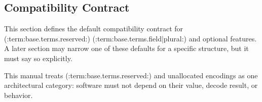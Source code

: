 \clearpage
\subsection{Compatibility Contract}

This section defines the default compatibility contract for (:term:base.terms.reserved:) (:term:base.terms.field|plural:) and optional features. A later section
may narrow one of these defaults for a specific structure, but it must say so explicitly.

This manual treats (:term:base.terms.reserved:) and unallocated encodings as one architectural category: software must not depend on their
value, decode result, or behavior.
